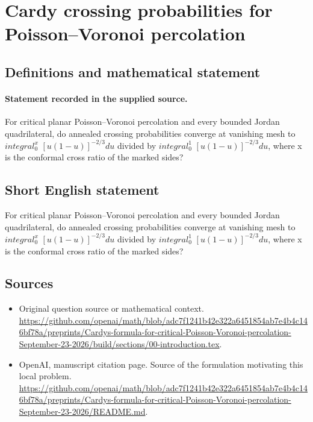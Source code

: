 \documentclass[11pt]{article}
\begin{document}
\section*{Cardy crossing probabilities for Poisson–Voronoi percolation}\label{statement}
\subsection{Definitions and mathematical statement}
\paragraph{Statement recorded in the supplied source.}
For critical planar Poisson–Voronoi percolation and every bounded Jordan quadrilateral, do annealed crossing probabilities converge at vanishing mesh to $integral_0^x$ $[u(1-u)]^{-2/3}du$ divided by $integral_0^1$ $[u(1-u)]^{-2/3}du$, where x is the conformal cross ratio of the marked sides?
\subsection{Short English statement}
For critical planar Poisson–Voronoi percolation and every bounded Jordan quadrilateral, do annealed crossing probabilities converge at vanishing mesh to $integral_0^x$ $[u(1-u)]^{-2/3}du$ divided by $integral_0^1$ $[u(1-u)]^{-2/3}du$, where x is the conformal cross ratio of the marked sides?
\subsection{Sources}
\begin{itemize}
\item[S1] Original question source or mathematical context.
\url{https://github.com/openai/math/blob/adc7f1241b42e322a6451854ab7e4b4c146bf78a/preprints/Cardys-formula-for-critical-Poisson-Voronoi-percolation-September-23-2026/build/sections/00-introduction.tex}.
\item[S2] OpenAI, manuscript citation page. Source of the formulation motivating this local problem.
\url{https://github.com/openai/math/blob/adc7f1241b42e322a6451854ab7e4b4c146bf78a/preprints/Cardys-formula-for-critical-Poisson-Voronoi-percolation-September-23-2026/README.md}.
\end{itemize}
\end{document}
